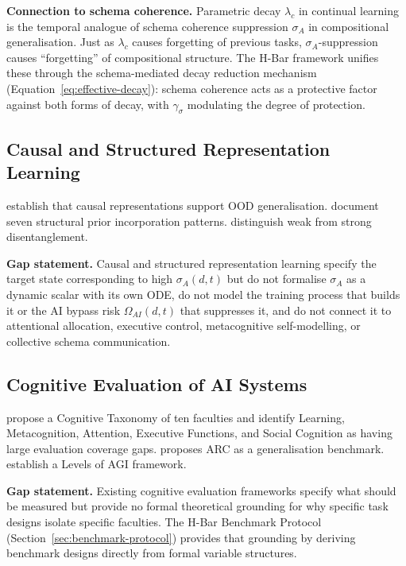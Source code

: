 \documentclass[11pt,a4paper]{article}
\begin{document}
\textbf{Connection to schema coherence.} Parametric decay $\lambda_c$ in
continual learning is the temporal analogue of schema coherence suppression
$\sigma_A$ in compositional generalisation. Just as $\lambda_c$ causes
forgetting of previous tasks, $\sigma_A$-suppression causes ``forgetting''
of compositional structure. The H-Bar framework unifies these through the
schema-mediated decay reduction mechanism (Equation~\ref{eq:effective-decay}):
schema coherence acts as a protective factor against both forms of decay,
with $\gamma_\sigma$ modulating the degree of protection.

\subsection{Causal and Structured Representation Learning}\label{sec:causal-repr}

\cite{scholkopf2021towardcausalrepresentationlearning} establish that
causal representations support OOD generalisation.
\cite{mohan2024structureindrlsurveyopenproblems} document seven structural
prior incorporation patterns. \cite{torresan2024disentangledrepresentationscausalcognition}
distinguish weak from strong disentanglement.

\textbf{Gap statement.} Causal and structured representation learning
specify the target state corresponding to high $\sigma_A(d,t)$ but do
not formalise $\sigma_A$ as a dynamic scalar with its own ODE, do not
model the training process that builds it or the AI bypass risk
$\Omega_{AI}(d,t)$ that suppresses it, and do not connect it to
attentional allocation, executive control, metacognitive self-modelling,
or collective schema communication.

\subsection{Cognitive Evaluation of AI Systems}\label{sec:cognitive-eval}

\cite{burnell2026measuringprogressagi} propose a Cognitive Taxonomy of
ten faculties and identify Learning, Metacognition, Attention, Executive
Functions, and Social Cognition as having large evaluation coverage gaps.
\cite{chollet2019measureintelligence} proposes ARC as a generalisation
benchmark. \cite{morris2023levelsagi} establish a Levels of AGI framework.

\textbf{Gap statement.} Existing cognitive evaluation frameworks specify
what should be measured but provide no formal theoretical grounding for
why specific task designs isolate specific faculties. The H-Bar Benchmark
Protocol (Section~\ref{sec:benchmark-protocol}) provides that grounding
by deriving benchmark designs directly from formal variable structures.
\end{document}

